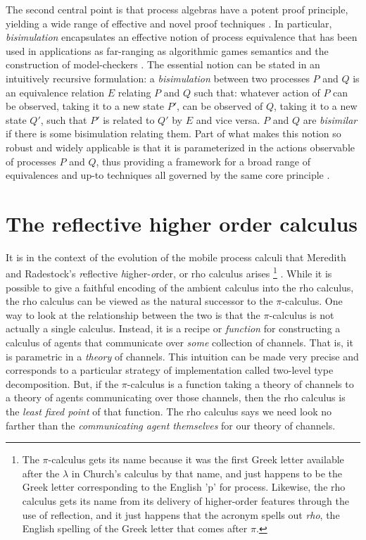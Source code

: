 The second central point is that process algebras have a potent proof
principle, yielding a wide range of effective and novel proof
techniques \cite{DBLP:conf/concur/SangiorgiM92}
\cite{DBLP:conf/fmco/Sangiorgi05}
\cite{DBLP:journals/toplas/Sangiorgi09}. In particular,
\emph{bisimulation} encapsulates an effective notion of process
equivalence that has been used in applications as far-ranging as
algorithmic games semantics \cite{DBLP:conf/sas/Abramsky05} and the
construction of model-checkers \cite{caires_2004}. The essential
notion can be stated in an intuitively recursive formulation: a
\emph{bisimulation} between two processes $P$ and $Q$ is an
equivalence relation $E$ relating $P$ and $Q$ such that: whatever
action of $P$ can be observed, taking it to a new state $P'$, can be
observed of $Q$, taking it to a new state $Q'$, such that $P'$ is
related to $Q'$ by $E$ and vice versa. $P$ and $Q$ are
\emph{bisimilar} if there is some bisimulation relating them. Part of
what makes this notion so robust and widely applicable is that it is
parameterized in the actions observable of processes $P$ and $Q$, thus
providing a framework for a broad range of equivalences and up-to
techniques \cite{DBLP:conf/concur/SangiorgiM92} all governed by the
same core principle \cite{DBLP:journals/toplas/Sangiorgi09}.

\section{The reflective higher order calculus}

It is in the context of the evolution of the mobile process calculi
that Meredith and Radestock's \emph{r}eflective
\emph{h}igher-\emph{o}rder, or rho calculus arises \footnote{The
$\pi$-calculus gets its name because it was the first Greek letter
available after the $\lambda$ in Church's calculus by that name, and
just happens to be the Greek letter corresponding to the English 'p'
for process. Likewise, the rho calculus gets its name from its
delivery of higher-order features through the use of reflection, and
it just happens that the acronym spells out \emph{rho}, the English
spelling of the Greek letter that comes after $\pi$.}
\cite{DBLP:journals/entcs/MeredithR05}. While it is possible to give a
faithful encoding of the ambient calculus into the rho calculus, the
rho calculus can be viewed as the natural successor to the
$\pi$-calculus. One way to look at the relationship between the two is
that the $\pi$-calculus is not actually a single calculus. Instead, it
is a recipe or \emph{function} for constructing a calculus of agents
that communicate over \emph{some} collection of channels. That is, it
is parametric in a \emph{theory} of channels. This intuition can be
made very precise and corresponds to a particular strategy of
implementation called two-level type decomposition. But, if the
$\pi$-calculus is a function taking a theory of channels to a theory
of agents communicating over those channels, then the rho calculus is
the \emph{least fixed point} of that function. The rho calculus says
we need look no farther than the \emph{communicating agent themselves}
for our theory of channels.

